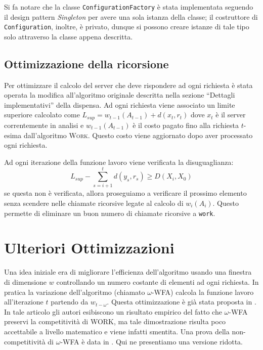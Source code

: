 \documentclass[a4paper, 10pt]{article}
\begin{document}
Si fa notare che la classe \texttt{ConfigurationFactory} è stata 
implementata seguendo il design pattern \emph{Singleton} per avere una sola
istanza della classe; il costruttore di \texttt{Configuration}, inoltre, è 
privato, dunque si possono creare istanze di tale tipo solo attraverso la 
classe appena descritta.

\subsection{Ottimizzazione della ricorsione}
Per ottimizzare il calcolo del server che deve rispondere ad ogni richiesta 
è stata operata la modifica all'algoritmo originale descritta nella sezione
``Dettagli implementativi'' della dispensa. Ad ogni richiesta viene associato
un limite superiore calcolato come $L_{sup} = w_{t - 1}(A_{t - 1}) + d(x_t, r_t)$ 
dove $x_t$ è il server correntemente in analisi e $w_{t - 1}(A_{t - 1})$ è il
costo pagato fino alla richiesta $t$-esima dall'algoritmo \textsc{Work}. Questo
costo viene aggiornato dopo aver processato ogni richiesta. 

Ad ogni iterazione della funzione lavoro viene verificata la disuguaglianza:
\[
  L_{sup} - \sum_{s = i + 1}^{t} d(y_s, r_s) \geq D(X_i, X_0)
\]
se questa non è verificata, allora proseguiamo a verificare il prossimo elemento senza scendere nelle chiamate ricorsive legate al calcolo di $w_i(A_i)$. Questo permette di eliminare un buon numero di chiamate ricorsive a \texttt{work}. 

\section{Ulteriori Ottimizzazioni}
Una idea iniziale era di migliorare l'efficienza dell'algoritmo usando una 
finestra di dimensione $w$ controllando un numero costante di elementi 
ad ogni richiesta. In pratica la variazione dell'algoritmo (chiamato $\omega$-WFA) 
calcola la funzione lavoro all'iterazione $t$ partendo da $w_{t - \omega}$. Questa 
ottimizzazione è già stata proposta in \cite{baumgartner}. In tale articolo 
gli autori esibiscono un risultato empirico del fatto che $\omega$-WFA preservi la 
competitività di \textsc{WORK}, ma tale dimostrazione risulta poco accettabile a livello matematico e
viene infatti smentita. Una prova della non-competitività di $\omega$-WFA è data in
\cite{rudec}. Qui ne presentiamo una versione ridotta. 
\end{document}
